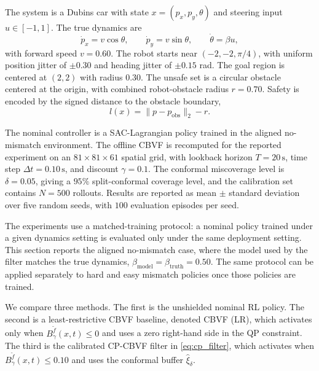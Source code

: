 \documentclass[letterpaper,10pt,conference]{ieeeconf}
\newcommand{\Bm}{B_{\gamma}^{\tilde f}}
\newcommand{\xv}{x}
\newcommand{\uv}{u}
\begin{document}
The system is a Dubins car with state $\xv=(p_x,p_y,\theta)$ and steering
input $\uv\in[-1,1]$. The true dynamics are
\begin{equation}
    \dot p_x = v\cos\theta,\qquad
    \dot p_y = v\sin\theta,\qquad
    \dot\theta = \beta u,
    \label{eq:dubins_dynamics_exp}
\end{equation}
with forward speed $v=0.60$. The robot starts near
$(-2,-2,\pi/4)$, with uniform position jitter of $\pm 0.30$ and heading jitter
of $\pm 0.15$ rad. The goal region is centered at $(2,2)$ with radius $0.30$.
The unsafe set is a circular obstacle centered at the origin, with combined
robot-obstacle radius $r=0.70$. Safety is encoded by the signed distance to the
obstacle boundary,
\begin{equation}
    l(\xv)=\|p-p_{\mathrm{obs}}\|_2-r .
    \label{eq:signed_distance_exp}
\end{equation}

The nominal controller is a SAC-Lagrangian policy trained in the aligned
no-mismatch environment. The offline CBVF is recomputed for the reported
experiment on an $81\times 81\times 61$ spatial grid, with lookback horizon
$T=20\,\mathrm{s}$, time step $\Delta t=0.10\,\mathrm{s}$, and discount
$\gamma=0.1$. The conformal miscoverage level is $\delta=0.05$, giving a
$95\%$ split-conformal coverage level, and the calibration set contains
$N=500$ rollouts. Results are reported as mean $\pm$ standard deviation over
five random seeds, with $100$ evaluation episodes per seed.

The experiments use a matched-training protocol: a nominal policy trained under
a given dynamics setting is evaluated only under the same deployment setting.
This section reports the aligned no-mismatch case, where the model used by the
filter matches the true dynamics,
$\beta_{\mathrm{model}}=\beta_{\mathrm{truth}}=0.50$. The same protocol can be
applied separately to hard and easy mismatch policies once those policies are
trained.

We compare three methods. The first is the unshielded nominal RL policy. The
second is a least-restrictive CBVF baseline, denoted CBVF (LR), which activates
only when $\Bm(\xv,t)\le 0$ and uses a zero right-hand side in the QP
constraint. The third is the calibrated CP-CBVF filter in \eqref{eq:cp_filter},
which activates when $\Bm(\xv,t)\le 0.10$ and uses the conformal buffer
$\widehat\xi_\delta$.
\end{document}
